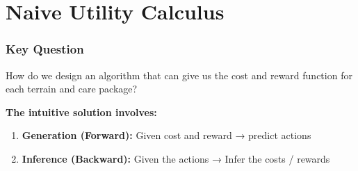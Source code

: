 \documentclass{beamer}
\begin{document}

\section{Naive Utility Calculus}

\begin{frame}
\frametitle{Key Question}
\begin{center}
\Large How do we design an algorithm that can give us the cost and reward function for each terrain and care package?
\end{center}

\vspace{0.5cm}
\textbf{The intuitive solution involves:}

\vspace{0.3cm}
\begin{enumerate}
    \item \textbf{Generation (Forward):} Given cost and reward → predict actions
    \item \textbf{Inference (Backward):} Given the actions → Infer the costs / rewards
\end{enumerate}
\end{frame}
\end{document}
